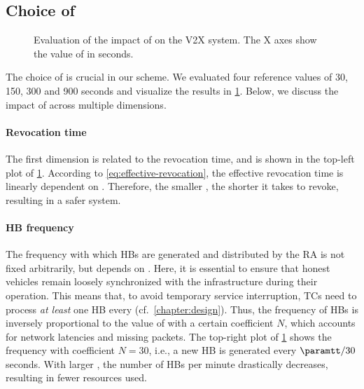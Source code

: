 

\subsection{Choice of \paramtt{}}
\label{section:eval-tv}

\begin{figure}[t]
  \centering
  \hspace*{-0.3cm}
  \resizebox{.9\linewidth}{!} {
    
  } \caption[Evaluation of the impact of \paramtt{} on the V2X system]{Evaluation of the impact of \paramtt{} on the \acs{V2X} system. The
  X axes show the value of \paramtt{} in seconds.}
  \label{fig:eval-tv}
\end{figure}

The choice of \paramtt{} is crucial in our scheme. We evaluated four reference
values of 30, 150, 300 and 900 seconds and visualize the results in
\cref{fig:eval-tv}. Below, we discuss the impact of \paramtt{} across multiple
dimensions. 

\paragraph{Revocation time}
%
The first dimension is related to the revocation time, and is shown in the
top-left plot of \cref{fig:eval-tv}. According to
\cref{eq:effective-revocation}, the effective revocation time \paramteff{} is
linearly dependent on \paramtt{}. Therefore, the smaller \paramtt, the shorter
it takes to revoke, resulting in a safer system.

\paragraph{\ac{HB} frequency}
%
The frequency with which \acp{HB} are generated and distributed by the \ac{RA}
is not fixed arbitrarily, but depends on \paramtt{}. Here, it is essential to
ensure that honest vehicles remain loosely synchronized with the infrastructure
during their operation. This means that, to avoid temporary service
interruption, \acp{TC} need to process \emph{at least} one \ac{HB} every
\paramtt{} (cf.~\cref{chapter:design}). Thus, the frequency of \acp{HB} is
inversely proportional to the value of \paramtt{} with a certain coefficient
$N$, which accounts for network latencies and missing packets. The top-right
plot of \cref{fig:eval-tv} shows the frequency with coefficient $N = 30$, i.e.,
a new \ac{HB} is generated every $\paramtt / 30$ seconds. With larger
\paramtt{}, the number of \acp{HB} per minute drastically decreases, resulting
in fewer resources used.

